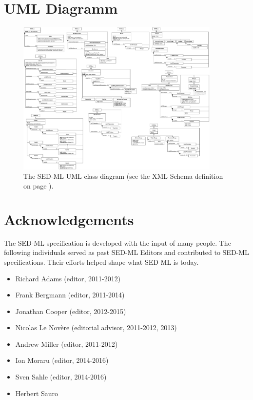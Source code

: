 \documentclass[pdftex,rgb,dvipsnames,svgnames,hyperref,table]{report}
\begin{document}
\chapter{UML Diagramm}
\label{chp:uml}
\begin{figure}
    \includegraphics[width=0.9\textwidth]{images/uml/all}
    \caption{The SED-ML \currentLV UML class diagram (see the XML Schema definition on page \pageref{lst:schema}).}
    \label{fig:sedML}
\end{figure}

\chapter{Acknowledgements}
\label{chp:acknowledgments}
The SED-ML specification is developed with the input of many people. The following individuals served as past SED-ML Editors and contributed to SED-ML specifications. Their efforts helped shape what SED-ML is today.

\begin{itemize}
\item Richard Adams (editor, 2011-2012)
\item Frank Bergmann (editor, 2011-2014)
\item Jonathan Cooper (editor, 2012-2015)
\item Nicolas Le Novère (editorial advisor, 2011-2012, 2013)
\item Andrew Miller (editor, 2011-2012)
\item Ion Moraru (editor, 2014-2016)
\item Sven Sahle (editor, 2014-2016)
\item Herbert Sauro
\end{itemize}
\end{document}
